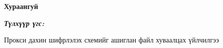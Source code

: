 

\begin{center}
{\scshape\Large \univname\par} %
{\scshape\large \facname\par}\vspace{0.5cm} %
{\huge\textbf{{Хураангуй}} \par}
\bigskip
{\Large{\ttitle} \par} %
\bigskip

{\normalsize \shortname \par} %
\addressname
\end{center}

\textit{\textbf{Түлхүүр үгс: \keywordnames}}
\bigskip

Прокси дахин шифрлэлэх схемийг ашиглан файл хуваалцах үйлчилгээ